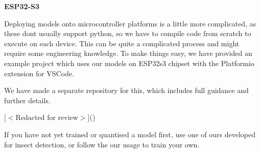 {\bfseries{ESP32-\/\+S3}}\begin{adjustwidth}{1em}{0em}


Deploying models onto microcontroller platforms is a little more complicated, as these don\textquotesingle{}t usually support python, so we have to compile code from scratch to execute on each device. This can be quite a complicated process and might require some engineering knowledge. To make things easy, we have provided an example project which uses our models on ESP32s3 chipset with the Platformio extension for VSCode.

We have made a separate repository for this, which includes full guidance and further details.

\mbox{[}$<$\+Redacted for review$>$\mbox{]}()

\end{adjustwidth}


If you have not yet trained or quantised a model first, use one of ours developed for insect detection, or follow the our usage  to train your own. 